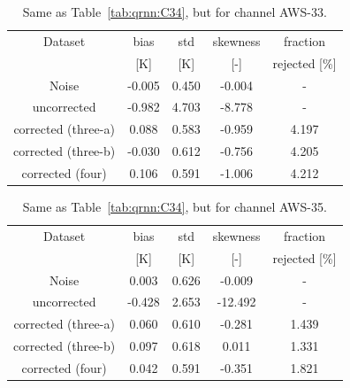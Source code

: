 \documentclass[12pt]{article}
\begin{document}
\begin{table}[!p]
	\centering
	\begin{tabular}[b]{c|c|c|c|c}
		Dataset  		  &   bias &   std &   skewness & fraction  \\
		&   [K]  &   [K] & [-] & rejected [\%]\\
		\hline
		Noise                       & -0.005 & 0.450 &             -0.004 &      - \\
		uncorrected                 & -0.982 & 4.703 &             -8.778 &      - \\
		corrected (three-a) 		&  0.088 & 0.583 &             -0.959 &      4.197 \\
		corrected (three-b)  		& -0.030 & 0.612 &             -0.756 &      4.205 \\
		corrected (four)            &  0.106 & 0.591 &             -1.006 &      4.212 \\
		\hline
		
	\end{tabular}
	\caption{ Same as Table~\ref{tab:qrnn:C34}, but for channel AWS-33.}
	\label{tab:qrnn:C33}
\end{table}

\begin{table}[!p]
	\centering
	\begin{tabular}[b]{c|c|c|c|c}
		Dataset  		  &   bias &   std &   skewness & fraction  \\
		&   [K]  &   [K] & [-] & rejected [\%]\\
		\hline
		
		Noise                      &  0.003 & 0.626 &             -0.009 &      - \\
		uncorrected                & -0.428 & 2.653 &            -12.492 &      - \\
		corrected (three-a) 	   &  0.060 & 0.610 &             -0.281 &      1.439 \\
		corrected (three-b) 	   &  0.097 & 0.618 &              0.011 &      1.331 \\
		corrected (four)   		   &  0.042 & 0.591 &             -0.351 &      1.821 \\
		\hline
	\end{tabular}
	\caption{ Same as Table~\ref{tab:qrnn:C34}, but for channel AWS-35.}
	\label{tab:qrnn:C35}
\end{table}
\end{document}
